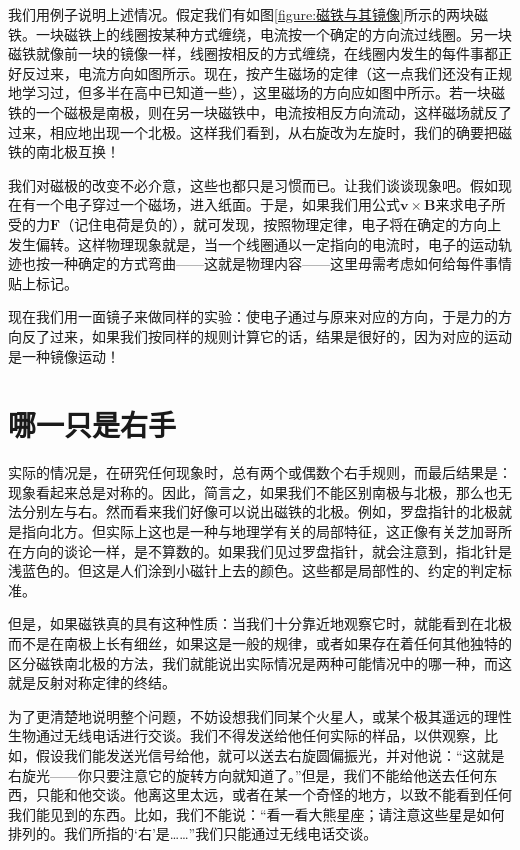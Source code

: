 我们用例子说明上述情况。假定我们有如图\ref{figure:磁铁与其镜像}所示的两块磁铁。一块磁铁上的线圈按某种方式缠绕，电流按一个确定的方向流过线圈。另一块磁铁就像前一块的镜像一样，线圈按相反的方式缠绕，在线圈内发生的每件事都正好反过来，电流方向如图所示。现在，按产生磁场的定律（这一点我们还没有正规地学习过，但多半在高中已知道一些），这里磁场的方向应如图中所示。若一块磁铁的一个磁极是南极，则在另一块磁铁中，电流按相反方向流动，这样磁场就反了过来，相应地出现一个北极。这样我们看到，从右旋改为左旋时，我们的确要把磁铁的南北极互换！

我们对磁极的改变不必介意，这些也都只是习惯而已。让我们谈谈现象吧。假如现在有一个电子穿过一个磁场，进入纸面。于是，如果我们用公式$\boldsymbol{v}\times\boldsymbol{B}$来求电子所受的力$\boldsymbol{F}$（记住电荷是负的），就可发现，按照物理定律，电子将在确定的方向上发生偏转。这样物理现象就是，当一个线圈通以一定指向的电流时，电子的运动轨迹也按一种确定的方式弯曲——这就是物理内容——这里毋需考虑如何给每件事情贴上标记。

现在我们用一面镜子来做同样的实验：使电子通过与原来对应的方向，于是力的方向反了过来，如果我们按同样的规则计算它的话，结果是很好的，因为对应的运动是一种镜像运动！

\section{哪一只是右手}

实际的情况是，在研究任何现象时，总有两个或偶数个右手规则，而最后结果是：现象看起来总是对称的。因此，简言之，如果我们不能区别南极与北极，那么也无法分别左与右。然而看来我们好像可以说出磁铁的北极。例如，罗盘指针的北极就是指向北方。但实际上这也是一种与地理学有关的局部特征，这正像有关芝加哥所在方向的谈论一样，是不算数的。如果我们见过罗盘指针，就会注意到，指北针是浅蓝色的。但这是人们涂到小磁针上去的颜色。这些都是局部性的、约定的判定标准。

但是，如果磁铁真的具有这种性质：当我们十分靠近地观察它时，就能看到在北极而不是在南极上长有细丝，如果这是一般的规律，或者如果存在着任何其他独特的区分磁铁南北极的方法，我们就能说出实际情况是两种可能情况中的哪一种，而这就是反射对称定律的终结。

为了更清楚地说明整个问题，不妨设想我们同某个火星人，或某个极其遥远的理性生物通过无线电话进行交谈。我们不得发送给他任何实际的样品，以供观察，比如，假设我们能发送光信号给他，就可以送去右旋圆偏振光，并对他说：“这就是右旋光——你只要注意它的旋转方向就知道了。”但是，我们不能给他送去任何东西，只能和他交谈。他离这里太远，或者在某一个奇怪的地方，以致不能看到任何我们能见到的东西。比如，我们不能说：“看一看大熊星座；请注意这些星是如何排列的。我们所指的‘右’是……”我们只能通过无线电话交谈。

